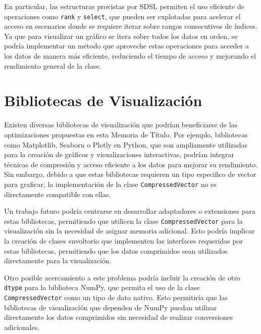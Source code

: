 En particular, las estructuras provistas por SDSL permiten el uso eficiente de operaciones como \texttt{rank} y \texttt{select}, que pueden ser explotadas para acelerar el acceso en escenarios donde se requiere iterar sobre rangos consecutivos de índices. Ya que para visualizar un gráfico se itera sobre todos los datos en orden, se podría implementar un método que aproveche estas operaciones para acceder a los datos de manera más eficiente, reduciendo el tiempo de acceso y mejorando el rendimiento general de la clase.

\section{Bibliotecas de Visualización}

Existen diversas bibliotecas de visualización que podrían beneficiarse de las optimizaciones propuestas en esta Memoria de Título. Por ejemplo, bibliotecas como Matplotlib, Seaborn o Plotly en Python, que son ampliamente utilizadas para la creación de gráficos y visualizaciones interactivas, podrían integrar técnicas de compresión y acceso eficiente a los datos para mejorar su rendimiento. Sin embargo, debido a que estas bibliotecas requieren un tipo especifico de vector para graficar, la implementación de la clase \texttt{CompressedVector} no es directamente compatible con ellas.

Un trabajo futuro podría centrarse en desarrollar adaptadores o extensiones para estas bibliotecas, permitiendo que utilicen la clase \texttt{CompressedVector} para la visualización sin la necesidad de asignar memoria adicional. Esto podría implicar la creación de clases envoltorio que implementen las interfaces requeridas por estas bibliotecas, permitiendo que los datos comprimidos sean utilizados directamente para la visualización.

Otro posible acercamiento a este problema podría incluir la creación de otro \texttt{dtype} para la biblioteca NumPy, que permita el uso de la clase \texttt{CompressedVector} como un tipo de dato nativo. Esto permitiría que las bibliotecas de visualización que dependen de NumPy puedan utilizar directamente los datos comprimidos sin necesidad de realizar conversiones adicionales.

